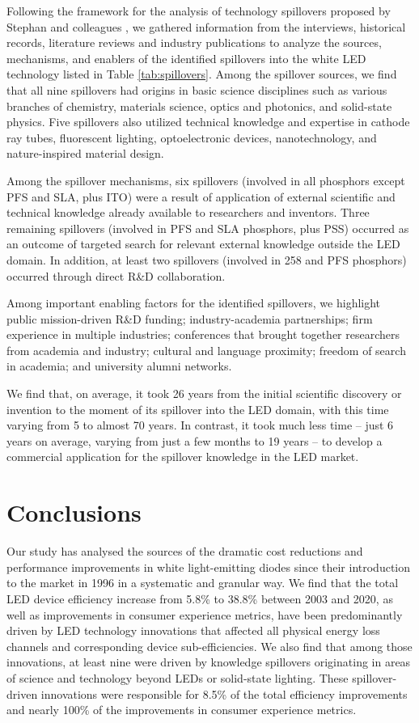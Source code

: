 \documentclass[journal=jacsat,manuscript=article]{achemso}
\begin{document}
Following the framework for the analysis of technology spillovers proposed by Stephan and colleagues \cite{Stephan2021}, we gathered information from the interviews, historical records, literature reviews and industry publications to analyze the sources, mechanisms, and enablers of the identified spillovers into the white LED technology listed in Table \ref{tab:spillovers}. Among the spillover sources, we find that all nine spillovers had origins in basic science disciplines such as various branches of chemistry, materials science, optics and photonics, and solid-state physics. Five spillovers also utilized technical knowledge and expertise in cathode ray tubes, fluorescent lighting, optoelectronic devices, nanotechnology, and nature-inspired material design. 

Among the spillover mechanisms, six spillovers (involved in all phosphors except PFS and SLA, plus ITO) were a result of application of external scientific and technical knowledge already available to researchers and inventors. Three remaining spillovers (involved in PFS and SLA phosphors, plus PSS) occurred as an outcome of targeted search for relevant external knowledge outside the LED domain. In addition, at least two spillovers (involved in 258 and PFS phosphors) occurred through direct R\&D collaboration.

Among important enabling factors for the identified spillovers, we highlight public mission-driven R\&D funding; industry-academia partnerships; firm experience in multiple industries; conferences that brought together researchers from academia and industry; cultural and language proximity; freedom of search in academia; and university alumni networks.

We find that, on average, it took 26 years from the initial scientific discovery or invention to the moment of its spillover into the LED domain, with this time varying from 5 to almost 70 years. In contrast, it took much less time – just 6 years on average, varying from just a few months to 19 years – to develop a commercial application for the spillover knowledge in the LED market. 

\section{Conclusions}

Our study has analysed the sources of the dramatic cost reductions and performance improvements in white light-emitting diodes since their introduction to the market in 1996 in a systematic and granular way. We find that the total LED device efficiency increase from 5.8\% to 38.8\% between 2003 and 2020, as well as improvements in consumer experience metrics, have been predominantly driven by LED technology innovations that affected all physical energy loss channels and corresponding device sub-efficiencies. We also find that among those innovations, at least nine were driven by knowledge spillovers originating in areas of science and technology beyond LEDs or solid-state lighting. These spillover-driven innovations were responsible for 8.5\% of the total efficiency improvements and nearly 100\% of the improvements in consumer experience metrics. 
\end{document}
